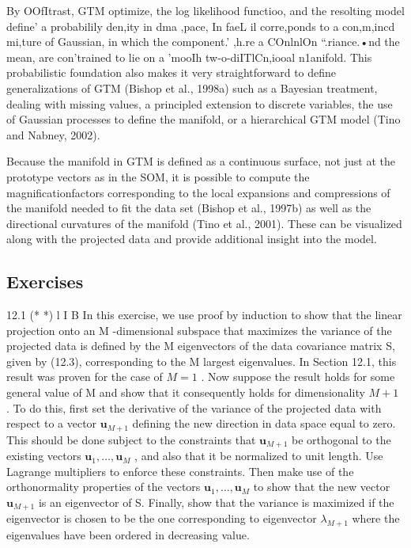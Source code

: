 \documentclass[
  10
]{article}
\begin{document}
By OOfItrast, GTM optimize, the log likelihood functioo, and the
resolting model define' a probabilily den,ity in dma ,pace, In faeL il
corre,ponds to a con,m,incd mi,ture of Gaussian, in which the
component.' ,h.re a COnlnlOn ``.riance.•nd the mean, are con'trained to
lie on a 'mooIh tw-o-diITlCn,iooal n1anifold. This probabilistic
foundation also makes it very straightforward to define generalizations
of GTM (Bishop et al., 1998a) such as a Bayesian treatment, dealing with
missing values, a principled extension to discrete variables, the use of
Gaussian processes to define the manifold, or a hierarchical GTM model
(Tino and Nabney, 2002).

Because the manifold in GTM is defined as a continuous surface, not just
at the prototype vectors as in the SOM, it is possible to compute the
magnificationfactors corresponding to the local expansions and
compressions of the manifold needed to fit the data set (Bishop et al.,
1997b) as well as the directional curvatures of the manifold (Tino et
al., 2001). These can be visualized along with the projected data and
provide additional insight into the model.

\subsection{Exercises}\label{exercises-1}

12.1 (* *) l I B In this exercise, we use proof by induction to show
that the linear projection onto an M -dimensional subspace that
maximizes the variance of the projected data is defined by the M
eigenvectors of the data covariance matrix S, given by (12.3),
corresponding to the M largest eigenvalues. In Section 12.1, this result
was proven for the case of \(M = 1\) . Now suppose the result holds for
some general value of M and show that it consequently holds for
dimensionality \(M + 1\) . To do this, first set the derivative of the
variance of the projected data with respect to a vector
\(\mathbf { u } _ { M + 1 }\) defining the new direction in data space
equal to zero. This should be done subject to the constraints that
\(\mathbf { u } _ { M + 1 }\) be orthogonal to the existing vectors
\(\mathbf { u } _ { 1 } , \dots , \mathbf { u } _ { M }\) , and also
that it be normalized to unit length. Use Lagrange multipliers to
enforce these constraints. Then make use of the orthonormality
properties of the vectors
\(\mathbf { u } _ { 1 } , \dots , \mathbf { u } _ { M }\) to show that
the new vector \(\mathbf { u } _ { M + 1 }\) is an eigenvector of S.
Finally, show that the variance is maximized if the eigenvector is
chosen to be the one corresponding to eigenvector
\(\lambda _ { M + 1 }\) where the eigenvalues have been ordered in
decreasing value.
\end{document}
